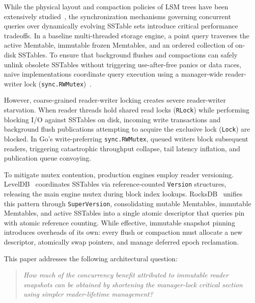 \documentclass[conference]{IEEEtran}
\begin{document}
While the physical layout and compaction policies of LSM trees have been extensively studied~\cite{lu2016wisckey,dayan2017monkey}, the synchronization mechanisms governing concurrent queries over dynamically evolving SSTable sets introduce critical performance tradeoffs. In a baseline multi-threaded storage engine, a point query traverses the active Memtable, immutable frozen Memtables, and an ordered collection of on-disk SSTables. To ensure that background flushes and compactions can safely unlink obsolete SSTables without triggering use-after-free panics or data races, naive implementations coordinate query execution using a manager-wide reader-writer lock (\texttt{sync.RWMutex})~\cite{bernstein1983concurrency}.

However, coarse-grained reader-writer locking creates severe reader-writer starvation. When reader threads hold shared read locks (\texttt{RLock}) while performing blocking I/O against SSTables on disk, incoming write transactions and background flush publications attempting to acquire the exclusive lock (\texttt{Lock}) are blocked. In Go's write-preferring \texttt{sync.RWMutex}, queued writers block subsequent readers, triggering catastrophic throughput collapse, tail latency inflation, and publication queue convoying.

To mitigate mutex contention, production engines employ reader versioning. LevelDB~\cite{dean2008leveldb} coordinates SSTables via reference-counted \texttt{Version} structures, releasing the main engine mutex during block index lookups. RocksDB~\cite{rocksdb} unifies this pattern through \texttt{SuperVersion}, consolidating mutable Memtables, immutable Memtables, and active SSTables into a single atomic descriptor that queries pin with atomic reference counting. While effective, immutable snapshot pinning introduces overheads of its own: every flush or compaction must allocate a new descriptor, atomically swap pointers, and manage deferred epoch reclamation.

This paper addresses the following architectural question:
\begin{quote}
\emph{How much of the concurrency benefit attributed to immutable reader snapshots can be obtained by shortening the manager-lock critical section using simpler reader-lifetime management?}
\end{quote}
\end{document}
